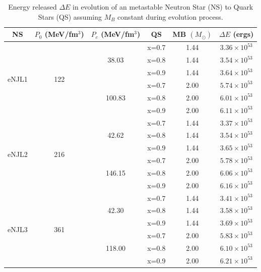 \documentclass[prc, reprint, amsmath, floatfix,10pt]{revtex4-1}
\begin{document}
\begin{table}[!htpb]

\centering
\caption{Energy released $\Delta E$ in evolution of an metastable Neutron Star (NS) to Quark Stars (QS) assuming $M_B$ constant during evolution process.}\label{table:ns-qs}
\begin{ruledtabular}
\begin{tabular}{cccccc}
NS                    & $P_0$ (MeV/fm$^3$) & $P_c$ (MeV/fm$^3$) & QS                                 &  MB $(M_\odot)$ & $\Delta E$ (ergs)      \\ \hline
\multirow{6}{*}{eNJL1}&\multirow{6}{*}{122}& \multirow{3}{*}{38.03}  & x=0.7 & 1.44   & $3.36\times 10^{53}$ \\ \cline{4-6} 
                      & 				   &   						 & x=0.8 & 1.44   & $3.54\times 10^{53}$ \\ \cline{4-6} 
                      & 				   &  						 & x=0.9 & 1.44   & $3.64\times 10^{53}$ \\ \cline{3-6} 
                      & 				   & \multirow{3}{*}{100.83} & x=0.7 & 2.00   & $5.74\times 10^{53}$ \\ \cline{4-6} 
                      & 				   & 						 & x=0.8 & 2.00   & $6.01\times 10^{53}$ \\ \cline{4-6} 
                      &					   &  						 & x=0.9 & 2.00   & $6.11\times 10^{53}$ \\ \hline
\multirow{6}{*}{eNJL2}&\multirow{6}{*}{216}& \multirow{3}{*}{42.62}	 & x=0.7 & 1.44   & $3.37\times 10^{53}$ \\ \cline{4-6} 
                      & 				   & 						 & x=0.8 & 1.44   & $3.54\times 10^{53}$ \\ \cline{4-6} 
                      & 				   & 						 & x=0.9 & 1.44   & $3.65\times 10^{53}$ \\ \cline{3-6} 
                      & 				   & \multirow{3}{*}{146.15} & x=0.7 & 2.00   & $5.78\times 10^{53}$ \\ \cline{4-6} 
                      & 				   & 						 & x=0.8 & 2.00   & $6.06\times 10^{53}$ \\ \cline{4-6} 
                      & 				   & 				  	     & x=0.9 & 2.00   & $6.16\times 10^{53}$ \\ \hline
\multirow{6}{*}{eNJL3}&\multirow{6}{*}{361}& \multirow{3}{*}{42.30}	 & x=0.7 & 1.44   & $3.41\times 10^{53}$ \\ \cline{4-6} 
                      & 				   & 		   				 & x=0.8 & 1.44   & $3.58\times 10^{53}$ \\ \cline{4-6} 
                      & 				   & 						 & x=0.9 & 1.44   & $3.69\times 10^{53}$ \\ \cline{3-6} 
                      & 				   & \multirow{3}{*}{118.00} & x=0.7 & 2.00   & $5.83\times 10^{53}$ \\ \cline{4-6} 
                      & 				   & 			 			 & x=0.8 & 2.00   & $6.10\times 10^{53}$ \\ \cline{4-6} 
                      &					   &  						 & x=0.9 & 2.00   & $6.21\times 10^{53}$ \\ 
\end{tabular}
\end{ruledtabular}
\end{table}
\end{document}
